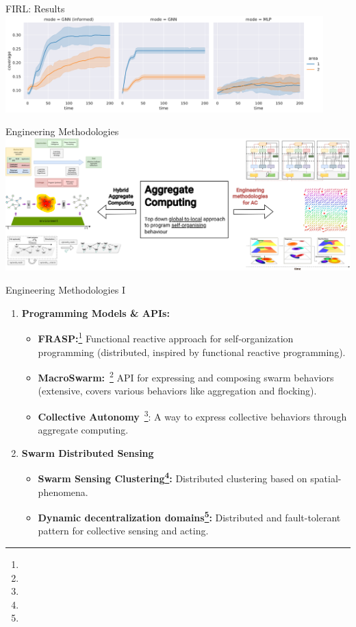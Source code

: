 \documentclass[presentation, 8pt,169]{beamer}\mode<presentation>{\usetheme{AMSBolognaFC}}
\begin{document}
\begin{frame}[allowframebreaks]{FIRL: Results}
\includegraphics[width=0.92\textwidth]{img/coverage-two-test.pdf}

\end{frame}
\begin{frame}{Engineering Methodologies}
  \includegraphics[width=\textwidth]{img/eng-part.drawio.png}
\end{frame}
\begin{frame}[fragile]{Engineering Methodologies I }

  \begin{enumerate}
  \item \textbf{Programming Models \& APIs:}
  
  \begin{itemize}
  \item \textbf{FRASP:}\footnote{} Functional reactive approach for self-organization programming (distributed, inspired by functional reactive programming).
  \item \textbf{MacroSwarm:}~\footnote{} API for expressing and composing swarm behaviors (extensive, covers various behaviors like aggregation and flocking).
  \item \textbf{Collective Autonomy}~\footnote{}: A way to express collective behaviors through aggregate computing.
  \end{itemize}
  
  \item \textbf{Swarm Distributed Sensing}
  
  \begin{itemize}
  \item \textbf{Swarm Sensing Clustering\footnote{}:} Distributed clustering based on spatial-phenomena.
  \item \textbf{Dynamic decentralization domains\footnote{}:} Distributed and fault-tolerant pattern for collective sensing and acting.
  \end{itemize}
\end{enumerate}

\end{frame}
\end{document}
